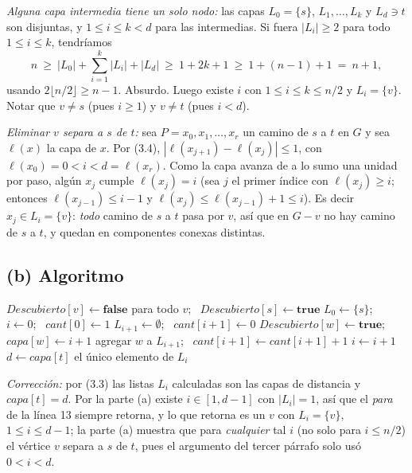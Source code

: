\emph{Alguna capa intermedia tiene un solo nodo:} las capas $L_0=\{s\}$, $L_1,\dots,L_k$ y $L_d\ni t$
son disjuntas, y $1\le i\le k<d$ para las intermedias. Si fuera $|L_i|\ge2$ para todo $1\le i\le k$,
tendríamos
\[ n\ \ge\ |L_0|+\sum_{i=1}^{k}|L_i|+|L_d|\ \ge\ 1+2k+1\ \ge\ 1+(n-1)+1\ =\ n+1, \]
usando $2\lfloor n/2\rfloor\ge n-1$. Absurdo. Luego existe $i$ con $1\le i\le k\le n/2$ y $L_i=\{v\}$.
Notar que $v\ne s$ (pues $i\ge1$) y $v\neq t$ (pues $i<d$).

\emph{Eliminar $v$ separa a $s$ de $t$:} sea $P=x_0,x_1,\dots,x_r$ un camino de $s$ a $t$ en $G$ y sea
$\ell(x)$ la capa de $x$. Por (3.4), $|\ell(x_{j+1})-\ell(x_j)|\le1$, con $\ell(x_0)=0<i<d=\ell(x_r)$.
Como la capa avanza de a lo sumo una unidad por paso, algún $x_j$ cumple $\ell(x_j)=i$ (sea $j$ el
primer índice con $\ell(x_j)\ge i$; entonces $\ell(x_{j-1})\le i-1$ y $\ell(x_j)\le\ell(x_{j-1})+1\le
i$). Es decir $x_j\in L_i=\{v\}$: \emph{todo} camino de $s$ a $t$ pasa por $v$, así que en
$G-v$ no hay camino de $s$ a $t$, y quedan en componentes conexas distintas.

\subsection*{(b) Algoritmo}
\begin{algorithm}[H]
\caption{Vértice que separa $s$ de $t$}
\begin{algorithmic}[1]
  \State $Descubierto[v]\gets\textbf{false}$ para todo $v$; \ $Descubierto[s]\gets\textbf{true}$
  \State $L_0\gets\{s\}$; \ $i\gets0$; \ $cant[0]\gets1$
   
    \State $L_{i+1}\gets\emptyset$; \ $cant[i+1]\gets 0$
          \State $Descubierto[w]\gets\textbf{true}$; \ $capa[w]\gets i+1$
          \State agregar $w$ a $L_{i+1}$; \ $cant[i+1]\gets cant[i+1]+1$
        \EndIf
      \EndFor
    \EndFor
    \State $i\gets i+1$
  \EndWhile
  \State $d\gets capa[t]$
     \State \Return el único elemento de $L_i$ \EndIf
  \EndFor
\EndFunction
\end{algorithmic}
\end{algorithm}
\emph{Corrección:} por (3.3) las listas $L_i$ calculadas son las capas de distancia y $capa[t]=d$. Por
la parte (a) existe $i\in[1,d-1]$ con $|L_i|=1$, así que el \emph{para} de la línea 13 siempre retorna,
y lo que retorna es un $v$ con $L_i=\{v\}$, $1\le i\le d-1$; la parte (a) muestra que para
\emph{cualquier} tal $i$ (no solo para $i\le n/2$) el vértice $v$ separa a $s$ de $t$, pues el argumento
del tercer párrafo solo usó $0<i<d$.

